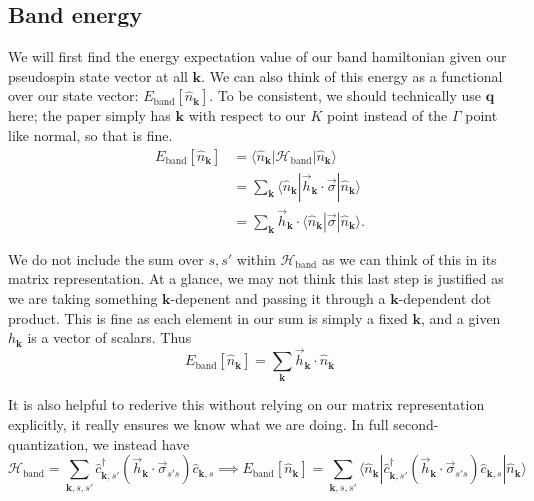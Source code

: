\documentclass[12pt]{revtex4-2}
\begin{document}
\subsection{Band energy}
We will first find the energy expectation value of our band hamiltonian given our pseudospin state vector at all $\mathbf{k}$.  We can also think of this energy as a functional over our state vector: $E_\text{band}[\hat{n}_\mathbf{k}]$.  To be consistent, we should technically use $\mathbf{q}$ here; the paper simply has $\mathbf{k}$ with respect to our $K$ point instead of the $\Gamma$ point like normal, so that is fine.
\begin{align}
    E_\text{band}[\hat{n}_\mathbf{k}] &= \langle \hat{n}_\mathbf{k} | \mathcal{H}_\text{band} | \hat{n}_\mathbf{k} \rangle \\
    &= \sum_\mathbf{k} \langle \hat{n}_\mathbf{k} | \vec{h}_\mathbf{k} \cdot \vec{\sigma}  | \hat{n}_\mathbf{k} \rangle \\
    &= \sum_\mathbf{k} \vec{h}_\mathbf{k} \cdot \langle \hat{n}_\mathbf{k} | \vec{\sigma}  | \hat{n}_\mathbf{k} \rangle.
\end{align}

We do not include the sum over $s,s'$ within $\mathcal{H}_\text{band}$ as we can think of this in its matrix representation.  At a glance, we may not think this last step is justified as we are taking something $\mathbf{k}$-depenent and passing it through a $\mathbf{k}$-dependent dot product.  This is fine as each element in our sum is simply a fixed $\mathbf{k}$, and a given $h_\mathbf{k}$ is a vector of scalars. Thus
\begin{equation}
    \boxed{ E_\text{band}[\hat{n}_\mathbf{k}] = \sum_\mathbf{k} \vec{h}_\mathbf{k} \cdot \hat{n}_\mathbf{k} }
\end{equation}

It is also helpful to rederive this without relying on our matrix representation explicitly, it really ensures we know what we are doing.  In full second-quantization, we instead have
\begin{equation}
    \mathcal{H}_\text{band} = \sum_{\mathbf{k},s,s'} \hat{c}_{\mathbf{k},s'}^\dagger (\vec{h}_\mathbf{k} \cdot \vec{\sigma}_{s's}) \hat{c}_{\mathbf{k},s} \implies E_\text{band}[\hat{n}_\mathbf{k}] = \sum_{\mathbf{k},s,s'} \langle \hat{n}_\mathbf{k} | \hat{c}_{\mathbf{k},s'}^\dagger (\vec{h}_\mathbf{k} \cdot \vec{\sigma}_{s's}) \hat{c}_{\mathbf{k},s} | \hat{n}_\mathbf{k} \rangle
\end{equation}
\end{document}

